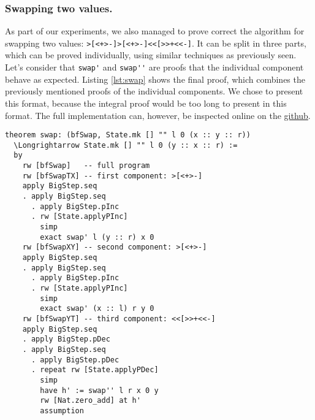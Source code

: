 \documentclass[runningheads]{llncs}
\newcommand{\cc}{\lstinline[mathescape]}
\begin{document}
\subsubsection{Swapping two values.}

As part of our experiments, we also managed to prove correct the algorithm for
swapping two values: \cc{>[<+>-]>[<+>-]<<[>>+<<-]}. It can be split in three
parts, which can be proved individually, using similar techniques as previously
seen. Let's consider that \cc{swap'} and \cc{swap''} are proofs that the
individual component behave as expected. Listing \ref{lst:swap} shows the final
proof, which combines the previously mentioned proofs of the individual
components. We chose to present this format, because the integral proof would
be too long to present in this format. The full implementation can, however, be
inspected online on the
\href{https://github.com/Stefan-Radu/master/tree/master/an2_DE_erasmus/logic_seminar/bf_operational_semantics}{github}.

\vspace{2mm}
\begin{lstlisting}[mathescape, label=lst:swap, 
    caption={Proof that the program \cc{>[<+>-]>[<+>-]<<[>>+<<-]} successfully
    swaps two consecutive memory cells}]
theorem swap: (bfSwap, State.mk [] "" l 0 (x :: y :: r))
  \Longrightarrow State.mk [] "" l 0 (y :: x :: r) :=
  by 
    rw [bfSwap]   -- full program
    rw [bfSwapTX] -- first component: >[<+>-]
    apply BigStep.seq
    . apply BigStep.seq
      . apply BigStep.pInc
      . rw [State.applyPInc]
        simp
        exact swap' l (y :: r) x 0
    rw [bfSwapXY] -- second component: >[<+>-]
    apply BigStep.seq
    . apply BigStep.seq
      . apply BigStep.pInc
      . rw [State.applyPInc]
        simp
        exact swap' (x :: l) r y 0
    rw [bfSwapYT] -- third component: <<[>>+<<-]
    apply BigStep.seq
    . apply BigStep.pDec
    . apply BigStep.seq
      . apply BigStep.pDec
      . repeat rw [State.applyPDec]
        simp
        have h' := swap'' l r x 0 y
        rw [Nat.zero_add] at h'
        assumption

\end{lstlisting}

\end{document}
